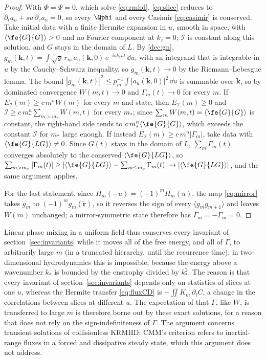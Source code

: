 \begin{proof}
With $\Phi=\Psi=0$, which solve \eqref{eq:rmhd}, \eqref{eq:slice} reduces to $\partial_ta_u+su\,\partial_za_u=0$, so every $\Qphi$ and every Casimir \eqref{eq:casimir} is conserved. Take initial data with a finite Hermite expansion in $u$, smooth in space, with $\langle\fe{G}{G}\rangle>0$ and no Fourier component at $k_z=0$; $\mathcal I$ is constant along this solution, and $G$ stays in the domain of $L$. By \eqref{dec:gn}, $g_m(\boldsymbol k,t)=\int\sqrt\varrho\,r_m\,a_u(\boldsymbol k,0)\,e^{-\ii sk_zut}\,\dd u$, with an integrand that is integrable in $u$ by the Cauchy--Schwarz inequality, so $g_m(\boldsymbol k,t)\to0$ by the Riemann--Lebesgue lemma. The bound $|g_m(\boldsymbol k,t)|^2\le p_m^{-1}\int|a_u(\boldsymbol k,0)|^2\,\dd u$ is summable over $\boldsymbol k$, so by dominated convergence $W(m,t)\to0$ and $\Gamma_m(t)\to0$ for every $m$. If $E_{\mathcal I}(m)\ge c\,m^nW(m)$ for every $m$ and state, then $E_{\mathcal I}(m)\ge0$ and $\mathcal I\ge c\,m_*^n\sum_{m>m_*}W(m,t)$ for every $m_*$; since $\sum_mW(m,t)=\langle\fe{G}{G}\rangle$ is constant, the right-hand side tends to $c\,m_*^n\langle\fe{G}{G}\rangle$, which exceeds the constant $\mathcal I$ for $m_*$ large enough. If instead $E_{\mathcal I}(m)\ge c\,m^n|\Gamma_m|$, take data with $\langle\fe{G}{LG}\rangle\ne0$. Since $G(t)$ stays in the domain of $L$, $\sum_m\Gamma_m(t)$ converges absolutely to the conserved $\langle\fe{G}{LG}\rangle$, so $\sum_{m>m_*}|\Gamma_m(t)|\ge|\langle\fe{G}{LG}\rangle-\sum_{m\le m_*}\Gamma_m(t)|\to|\langle\fe{G}{LG}\rangle|$, and the same argument applies.

For the last statement, since $H_m(-u)=(-1)^mH_m(u)$, the map \eqref{eq:mirror} takes $g_m$ to $(-1)^mg_m(\tilde{\boldsymbol r})$, so it reverses the sign of every $\langle g_mg_{m+1}\rangle$ and leaves $W(m)$ unchanged; a mirror-symmetric state therefore has $\Gamma_m=-\Gamma_m=0$.
\end{proof}

Linear phase mixing in a uniform field thus conserves every invariant of section~\ref{sec:invariants} while it moves all of the free energy, and all of $\Gamma$, to arbitrarily large $m$ (in a truncated hierarchy, until the recurrence time); in two-dimensional hydrodynamics this is impossible, because the energy above a wavenumber $k_*$ is bounded by the enstrophy divided by $k_*^2$. The reason is that every invariant of section~\ref{sec:invariants} depends only on statistics of slices at one $u$, whereas the Hermite transfer \eqref{eq:fluxCD} is $-\iint K_m\,\partial_tC$, a change in the correlations between slices at different $u$. The expectation of \citet{Chandran2026} that $\Gamma$, like $W$, is transferred to large $m$ is therefore borne out by these exact solutions, for a reason that does not rely on the sign-indefiniteness of $\Gamma$. The argument concerns transient solutions of collisionless KRMHD; CMM's criterion refers to inertial-range fluxes in a forced and dissipative steady state, which this argument does not address.
